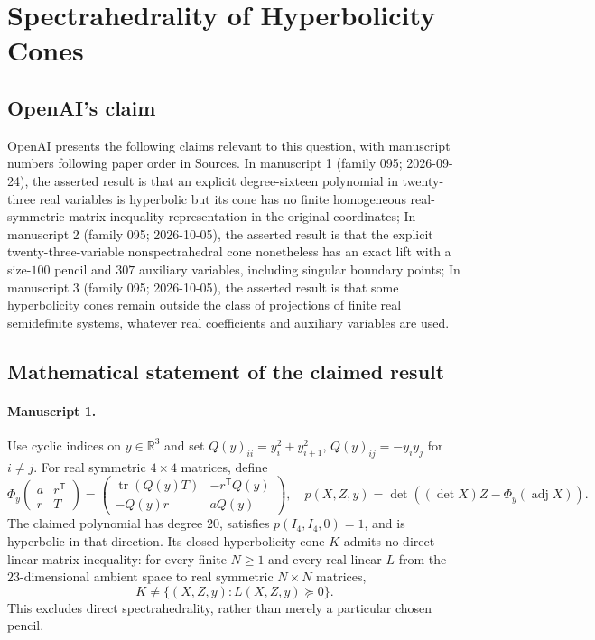 \documentclass[11pt]{article}
\begin{document}
\section*{Spectrahedrality of Hyperbolicity Cones}

\subsection{OpenAI's claim}
OpenAI presents the following claims relevant to this question, with manuscript numbers following paper order in Sources. In manuscript 1 (family 095; 2026-09-24), the asserted result is that an explicit degree-sixteen polynomial in twenty-three real variables is hyperbolic but its cone has no finite homogeneous real-symmetric matrix-inequality representation in the original coordinates; In manuscript 2 (family 095; 2026-10-05), the asserted result is that the explicit twenty-three-variable nonspectrahedral cone nonetheless has an exact lift with a size-$100$ pencil and $307$ auxiliary variables, including singular boundary points; In manuscript 3 (family 095; 2026-10-05), the asserted result is that some hyperbolicity cones remain outside the class of projections of finite real semidefinite systems, whatever real coefficients and auxiliary variables are used.

\subsection{Mathematical statement of the claimed result}
\paragraph{Manuscript 1.}
Use cyclic indices on $y\in\mathbb R^3$ and set $Q(y)_{ii}=y_i^2+y_{i+1}^2$, $Q(y)_{ij}=-y_i y_j$ for $i\ne j$. For real symmetric $4\times4$ matrices, define
\[
 \Phi_y\begin{pmatrix}a&r^{\mathsf T}\\r&T\end{pmatrix}
 =\begin{pmatrix}\operatorname{tr}(Q(y)T)&-r^{\mathsf T}Q(y)\\-Q(y)r&aQ(y)\end{pmatrix},
 \quad p(X,Z,y)=\det((\det X)Z-\Phi_y(\operatorname{adj}X)).
\]
The claimed polynomial has degree $20$, satisfies $p(I_4,I_4,0)=1$, and is hyperbolic in that direction. Its closed hyperbolicity cone $K$ admits no direct linear matrix inequality: for every finite $N\ge1$ and every real linear $L$ from the $23$-dimensional ambient space to real symmetric $N\times N$ matrices,
\[
 K\ne\{(X,Z,y):L(X,Z,y)\succeq0\}.
\]
This excludes direct spectrahedrality, rather than merely a particular chosen pencil.
\end{document}
